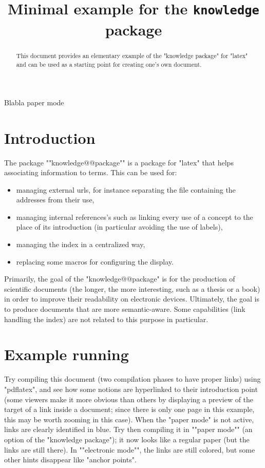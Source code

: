 \documentclass{article}
\title{Minimal example for the \texttt{knowledge} package}
\date{}
\begin{document}
\maketitle
\begin{abstract}
\AP This document provides an elementary example of the "knowledge package" for "latex" and can be used as a starting point for creating one's own document.
\end{abstract}

Blabla paper mode

\section{Introduction}
\label{section:introduction}

The package ""knowledge@@package"" is a package for "latex" that helps associating information to terms. This can be used for:
\begin{itemize}
\item managing external urls, for instance separating the file containing  the addresses from their use,
\item managing internal references's such as linking every use of a concept to the place of its introduction (in particular avoiding the use of labels),
\item managing the index in a centralized way,
\item replacing some macros for configuring the display.
\end{itemize}
Primarily, the goal of the "knowledge@@package" is for the production of scientific documents (the longer, the more interesting, such as a thesis or a book) in order to improve their readability on electronic devices. Ultimately, the goal is to produce documents that are more semantic-aware. Some capabilities (link handling the index) are not related to this purpose in particular.

\section{Example running}
\label{section:example}
Try compiling this document (two compilation phases to have proper links) using "pdflatex", and see how some notions are hyperlinked to their introduction point (some viewers make it more obvious than others by displaying a preview of the target of a link inside a document; since there is only one page in this example, this may be worth zooming in this case).
\AP When the "paper mode" is not active, links are clearly identified in blue. Try then compiling it in ""paper mode"" (an option of the "knowledge package"); it now looks like a regular paper (but the links are still there). In ""electronic mode"",
the links are still colored, but some other hints disappear like "anchor points".
\end{document}
